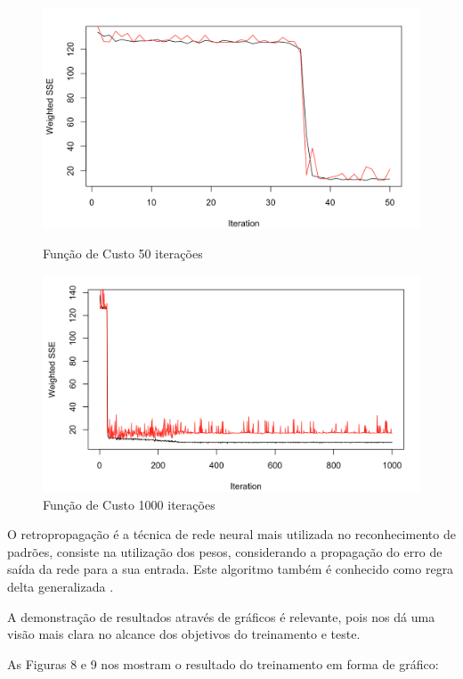 \documentclass[conference]{IEEEtran}
\begin{document}
    \begin{figure}[htbp]
	\centerline{\includegraphics[scale=0.4]{imagens/9,8,8,5,3-50.png}}
	\caption{Função de Custo 50 iterações}
	
	\centerline{\includegraphics[scale=0.4]{imagens/9,8,8,5,3-1000.png}}
	\caption{Função de Custo 1000 iterações}
	\label{fig}
	\end{figure}
	
	 O retropropagação é a técnica de rede neural mais utilizada no reconhecimento de padrões, consiste na utilização dos pesos, considerando a propagação do erro de saída da rede para a sua entrada. Este algoritmo também é conhecido como regra delta generalizada \cite{b12} \cite{b13}. 
	 
	 A demonstração de resultados através de gráficos é relevante, pois nos dá uma visão mais clara no alcance dos objetivos do treinamento e teste. 
	 
	 As Figuras 8 e 9 nos mostram o resultado do treinamento em forma de gráfico:
	 
\end{document}
